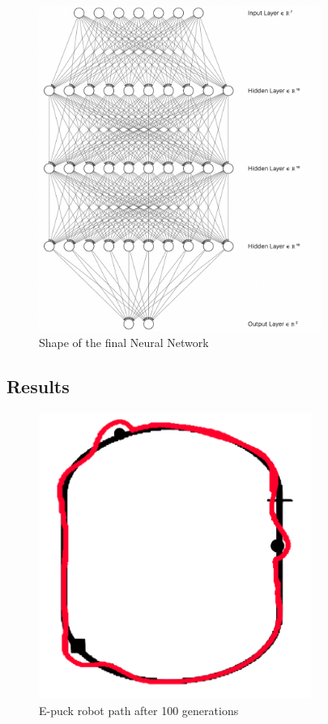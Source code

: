 \documentclass[lettersize,journal]{IEEEtran}
\begin{document}
\begin{figure}[H]
\centering
\includegraphics[width=3.64in]{nn.png}
\caption{Shape of the final Neural Network}
\label{nn}
\end{figure}


\subsection{Results}

\begin{figure}[H]
\centering
\includegraphics[width=3.5in]{path_last.png}
\caption{E-puck robot path after 100 generations}
\label{robot_path}
\end{figure}
\end{document}
